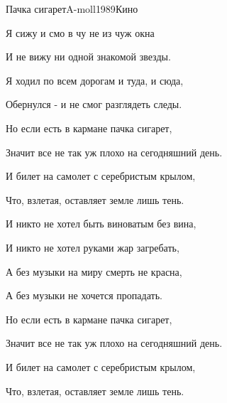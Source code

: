 \begin{song}{Пачка сигарет}{A-moll}{1989}{Кино}{}{}

\begin{SBVerse}
	Я сижу и смо в чу не из чуж окна

	И не вижу ни одной знакомой звезды.

	Я ходил по всем дорогам и туда, и сюда,

	Обернулся - и не смог разглядеть следы.
\end{SBVerse}

\begin{SBChorus}
	Но если есть в кармане пачка сигарет,

	Значит все не так уж плохо на сегодняшний день.

	И билет на самолет с серебристым крылом,

	Что, взлетая, оставляет земле лишь тень.
\end{SBChorus}

\begin{SBVerse}
	И никто не хотел быть виноватым без вина,

	И никто не хотел руками жар загребать,

	А без музыки на миру смерть не красна,

	А без музыки не хочется пропадать.
\end{SBVerse}

\begin{SBChorus}
	Но если есть в кармане пачка сигарет,

	Значит все не так уж плохо на сегодняшний день.

	И билет на самолет с серебристым крылом,

	Что, взлетая, оставляет земле лишь тень.
\end{SBChorus}

\end{song}
